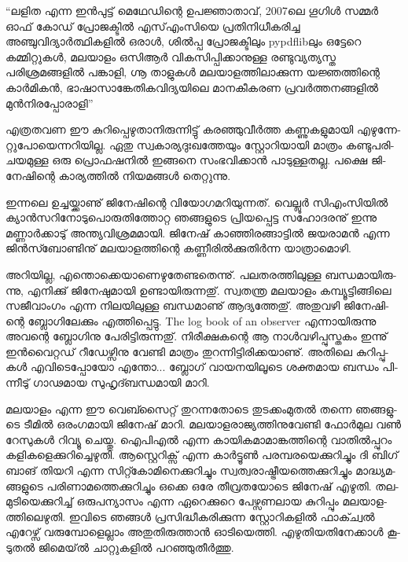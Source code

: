 {\vskip 2pt}

\begin{framed}
``ലളിത എന്ന ഇന്‍പുട്ട് മെഥേഡിന്റെ ഉപജ്ഞാതാവ്, 2007ലെ ഗൂഗിള്‍ സമ്മര്‍ ഓഫ് കോഡ് പ്രോജക്ടില്‍ എസ്എംസിയെ 
പ്രതിനിധീകരിച്ച അഞ്ചുവിദ്യാര്‍ത്ഥികളില്‍ ഒരാള്‍, ശില്‍പ്പ പ്രോജക്ടിലും pypdflibലും ഒട്ടേറെ കമ്മിറ്റുകള്‍, മലയാളം ഒസിആര്‍ 
വികസിപ്പിക്കാനുള്ള രണ്ടുവ്യത്യസ്ത പരിശ്രമങ്ങളില്‍ പങ്കാളി, ഗ്നൂ താളുകള്‍ മലയാളത്തിലാക്കുന്ന യജ്ഞത്തിന്റെ കാര്‍മികന്‍, 
ഭാഷാസാങ്കേതികവിദ്യയിലെ മാനകീകരണ പ്രവര്‍ത്തനങ്ങളില്‍ മുന്‍നിരപ്പോരാളി''
\end{framed}

{\vskip 12pt}

എ­ത്ര­ത­വണ ഈ കു­റി­പ്പെ­ഴു­താ­നി­രു­ന്നി­ട്ടു് കര­ഞ്ഞു­വീര്‍­ത്ത കണ്ണു­ക­ളു­മാ­യി എഴു­ന്നേ­റ്റു­പോ­യെ­ന്ന­റി­യി­ല്ല. ഏതു സ്വ­കാ­ര്യ­ദുഃ­ഖ­ത്തേ­യും 
സ്റ്റോ­റി­യാ­യി മാ­ത്രം കണ്ടു­പ­രി­ച­യ­മു­ള്ള ഒരു പ്രൊ­ഫ­ഷ­നില്‍ ഇങ്ങ­നെ സം­ഭ­വി­ക്കാന്‍ പാ­ടു­ള്ള­ത­ല്ല. പക്ഷെ ജി­നേ­ഷി­ന്റെ 
കാ­ര്യ­ത്തില്‍ നി­യ­മ­ങ്ങള്‍ തെ­റ്റു­ന്നു.

ഇ­ന്ന­ലെ ഉച്ച­യ്ക്കാ­ണു് ജി­നേ­ഷി­ന്റെ വി­യോ­ഗ­മ­റി­യു­ന്ന­ത്. വെ­ല്ലൂര്‍ സി­എം­സി­യില്‍ ക്യാന്‍­സ­റി­നോ­ടു­പൊ­രു­തി­ത്തോ­റ്റ ഞങ്ങ­ളു­ടെ 
പ്രി­യ­പ്പെ­ട്ട സഹോ­ദ­ര­നു് ഇന്നു മണ്ണാര്‍­ക്കാ­ടു് അന്ത്യ­വി­ശ്ര­മ­മാ­യി. ജി­നേ­ഷ് കാ­ഞ്ഞി­ര­ങ്ങാ­ട്ടില്‍ ജയ­രാ­മന്‍ എന്ന ജിന്‍സ്ബോണ്ടിനു്
മല­യാ­ള­ത്തി­ന്റെ കണ്ണീ­രില്‍­ക്കു­തിര്‍­ന്ന യാ­ത്രാ­മൊ­ഴി­.

അ­റി­യി­ല്ല, എന്തൊ­ക്കെ­യാ­ണെ­ഴു­തേ­ണ്ട­തെ­ന്നു്. പല­ത­ര­ത്തി­ലു­ള്ള ബന്ധ­മാ­യി­രു­ന്നു, എനി­ക്കു് ജി­നേ­ഷു­മാ­യി ഉണ്ടാ­യി­രു­ന്ന­തു്. 
സ്വ­ത­ന്ത്ര ­മ­ല­യാ­ളം­ കമ്പ്യൂ­ട്ടി­ങ്ങി­ലെ സജീ­വാം­ഗം എന്ന നി­ല­യി­ലു­ള്ള ബന്ധ­മാ­ണു് ആദ്യ­ത്തേ­തു്. അതു­വ­ഴി ജി­നേ­ഷി­ന്റെ 
ബ്ലോ­ഗി­ലേ­ക്കും എത്തി­പ്പെ­ട്ടു. The log book of an observer എന്നാ­യി­രു­ന്നു അവ­ന്റെ ബ്ലോ­ഗി­നു പേ­രി­ട്ടി­രു­ന്ന­തു്. നി­രീ­ക്ഷ­ക­ന്റെ 
ആ നാള്‍­വ­ഴി­പ്പു­സ്ത­കം ഇന്നു് ഇന്‍­വൈ­റ്റ­ഡ് റീ­ഡേ­ഴ്സി­നു വേ­ണ്ടി മാ­ത്രം തു­റ­ന്നി­ട്ടി­രി­ക്ക­യാ­ണു്. അതി­ലെ കു­റി­പ്പു­കള്‍ 
എവി­ടെ­പ്പോ­യോ എന്തോ­... ബ്ലോ­ഗ് വാ­യ­ന­യി­ലൂ­ടെ ശക്ത­മായ ബന്ധം പി­ന്നീ­ടു് ഗാ­ഢ­മായ സു­ഹൃ­ദ്ബ­ന്ധ­മാ­യി മാ­റി­.

മലയാളം എന്ന ഈ വെ­ബ്സൈ­റ്റ് തു­റ­ന്ന­തോ­ടെ തു­ട­ക്കം­മു­തല്‍ തന്നെ ഞങ്ങ­ളു­ടെ ടീ­മില്‍ ഒരം­ഗ­മാ­യി ജി­നേ­ഷ് മാ­റി. 
മലയാളരാജ്യത്തിനുവേണ്ടി ഫോര്‍­മുല വണ്‍ റേ­സു­കള്‍ റി­വ്യൂ ചെ­യ്തു. ഐപി­എല്‍ എന്ന കാ­യി­ക­മാ­മാ­ങ്ക­ത്തി­ന്റെ വാ­തില്‍­പ്പു­റം 
കളി­ക­ളെ­ക്കു­റി­ച്ചെ­ഴു­തി. ആസ്റ്റെ­റി­ക്സ് എന്ന കാര്‍­ട്ടൂണ്‍ പര­മ്പ­ര­യെ­ക്കു­റി­ച്ചും ദി ബി­ഗ് ബാ­ങ് തി­യ­റി എന്ന സി­റ്റ്കോ­മി­നെ­ക്കു­റി­ച്ചും 
സ്വ­ത്വ­രാ­ഷ്ട്രീ­യ­ത്തെ­ക്കു­റി­ച്ചും മാ­ദ്ധ്യ­മ­ങ്ങ­ളു­ടെ പരി­ണാ­മ­ത്തെ­ക്കു­റി­ച്ചും ഒക്കെ ഒരേ തീ­വ്ര­ത­യോ­ടെ ജി­നേ­ഷ് എഴു­തി. തല­മു­ടി­യെ­ക്കു­റി­ച്ച് 
ഒരു­പ­ന്യാ­സം എന്ന ഏറെ­ക്കു­റെ പേ­ഴ്സ­ണ­ലായ കു­റി­പ്പും മല­യാ­ള­ത്തി­ലെ­ഴു­തി. ഇവി­ടെ ഞങ്ങള്‍ പ്ര­സി­ദ്ധീ­ക­രി­ക്കു­ന്ന സ്റ്റോ­റി­ക­ളില്‍ 
ഫാ­ക്ച്വല്‍ എറേ­ഴ്സ് വരു­മ്പോ­ളെ­ല്ലാം അതു­തി­രു­ത്താന്‍ ഓടി­യെ­ത്തി. എഴു­തി­യ­തി­നേ­ക്കാള്‍ കൂ­ടു­തല്‍ ജി­മെ­യ്ല്‍ ചാ­റ്റു­ക­ളില്‍ 
പറ­ഞ്ഞു­തീര്‍­ത്തു­.

